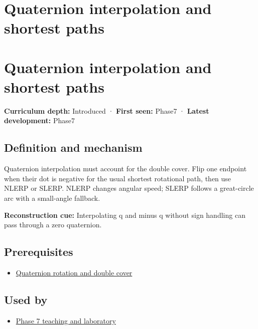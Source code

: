 \hypertarget{appendix-9b4b8254f26b}{}
\section*{Quaternion interpolation and shortest paths}
\section{Quaternion interpolation and shortest paths}\label{appendix-9b4b8254f26b-quaternion-interpolation-and-shortest-paths}

\textbf{Curriculum depth:} Introduced · \textbf{First seen:} Phase7 · \textbf{Latest development:} Phase7

\subsection{Definition and mechanism}\label{appendix-9b4b8254f26b-definition-and-mechanism}

Quaternion interpolation must account for the double cover. Flip one endpoint when their dot is negative for the usual shortest rotational path, then use NLERP or SLERP. NLERP changes angular speed; SLERP follows a great-circle arc with a small-angle fallback.

\textbf{Reconstruction cue:} Interpolating q and minus q without sign handling can pass through a zero quaternion.

\subsection{Prerequisites}\label{appendix-9b4b8254f26b-prerequisites}

\begin{itemize}
\tightlist
\item
  \hyperref[appendix-8e61ab68f6b2]{Quaternion rotation and double cover}
\end{itemize}

\subsection{Used by}\label{appendix-9b4b8254f26b-used-by}

\begin{itemize}
\tightlist
\item
  \hyperref[01-foundations-i-ch018-keep-the-promises-visible-while-moving-between-representations]{Phase 7 teaching and laboratory}
\end{itemize}

